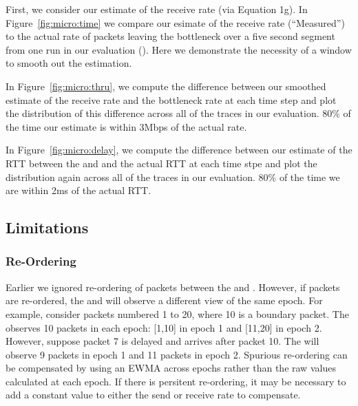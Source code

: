     First, we consider our estimate of the receive rate (via Equation 1g). In Figure~\ref{fig:micro:time}
    we compare our esimate of the receive rate (``Measured'') to the actual rate of packets 
    leaving the bottleneck over a five second segment from one run in our evaluation ().
    Here we demonstrate the necessity of a window to smooth out the estimation.

    In Figure~\ref{fig:micro:thru}, we compute the difference between our smoothed estimate of the receive rate 
    and the bottleneck rate at each time step and plot the distribution of this difference across
    all of the traces in our evaluation. 80\% of the time our estimate is within 3Mbps of the 
    actual rate.

    In Figure~\ref{fig:micro:delay}, we compute the difference between our estimate of the RTT between
    the \inbox and \outbox and the actual RTT at each time stpe and plot the distribution again
    across all of the traces in our evaluation. 80\% of the time we are within 2ms of the actual RTT.
    
\subsection{Limitations}
\subsubsection{Re-Ordering}
\label{s:measure:limitation:reorder}
Earlier we ignored re-ordering of packets between the \inbox and \outbox. However, if packets
are re-ordered, the \inbox and \outbox will observe a different view of the same epoch.
For example, consider packets numbered 1 to 20, where 10 is a boundary packet. The \inbox observes
10 packets in each epoch: [1,10] in epoch 1 and [11,20] in epoch 2. 
However, suppose packet 7 is delayed and arrives after packet 10. The \outbox will observe 9
packets in epoch 1 and 11 packets in epoch 2. 
Spurious re-ordering can be compensated by using an EWMA across epochs rather than the raw values
calculated at each epoch. If there is persitent re-ordering, it may be necessary to add a constant 
value to either the send or receive rate to compensate.

